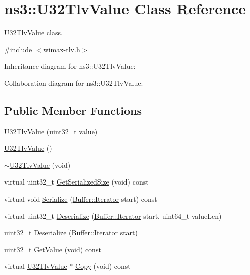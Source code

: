 \hypertarget{classns3_1_1U32TlvValue}{}\section{ns3\+:\+:U32\+Tlv\+Value Class Reference}
\label{classns3_1_1U32TlvValue}


\hyperlink{classns3_1_1U32TlvValue}{U32\+Tlv\+Value} class.  




{\ttfamily \#include $<$wimax-\/tlv.\+h$>$}



Inheritance diagram for ns3\+:\+:U32\+Tlv\+Value\+:


Collaboration diagram for ns3\+:\+:U32\+Tlv\+Value\+:
\subsection*{Public Member Functions}
\begin{DoxyCompactItemize}
\item 
\hyperlink{classns3_1_1U32TlvValue_a27903e8b1544ccf4a34fdf9fc5ac31df}{U32\+Tlv\+Value} (uint32\+\_\+t value)
\item 
\hyperlink{classns3_1_1U32TlvValue_aae228776b5e6ea100f889c8927dd9688}{U32\+Tlv\+Value} ()
\item 
\hyperlink{classns3_1_1U32TlvValue_a9cd247007685ad8808c34520bba0b47f}{$\sim$\+U32\+Tlv\+Value} (void)
\item 
virtual uint32\+\_\+t \hyperlink{classns3_1_1U32TlvValue_a82d115a8d4b919309a0978abad57bffc}{Get\+Serialized\+Size} (void) const 
\item 
virtual void \hyperlink{classns3_1_1U32TlvValue_af3f45e102adecef3344017fb11db2f39}{Serialize} (\hyperlink{classns3_1_1Buffer_1_1Iterator}{Buffer\+::\+Iterator} start) const 
\item 
virtual uint32\+\_\+t \hyperlink{classns3_1_1U32TlvValue_a7313258a457a2c251fb91d70533b2433}{Deserialize} (\hyperlink{classns3_1_1Buffer_1_1Iterator}{Buffer\+::\+Iterator} start, uint64\+\_\+t value\+Len)
\item 
uint32\+\_\+t \hyperlink{classns3_1_1U32TlvValue_a9383e60a1109b6a4bb0dd498b7fb83c6}{Deserialize} (\hyperlink{classns3_1_1Buffer_1_1Iterator}{Buffer\+::\+Iterator} start)
\item 
uint32\+\_\+t \hyperlink{classns3_1_1U32TlvValue_a5ef1c5135c3ff72fb189fce0cd15bdd6}{Get\+Value} (void) const 
\item 
virtual \hyperlink{classns3_1_1U32TlvValue}{U32\+Tlv\+Value} $\ast$ \hyperlink{classns3_1_1U32TlvValue_a43d0a14d0991bec564d866dbb54aa887}{Copy} (void) const 
\end{DoxyCompactItemize}
